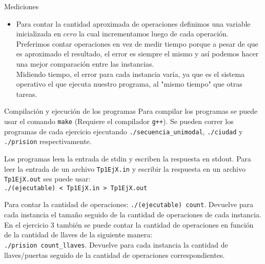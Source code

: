 \documentclass[12pt,titlepage]{article}
\begin{document}
	\begin{section}{Mediciones}
		\begin{itemize}
			\item Para contar la cantidad aproximada de operaciones definimos una variable inicializada en $cero$ la cual incrementamos luego de cada operación. Preferimos contar operaciones en vez de medir tiempo porque a pesar de que es aproximado el resultado, el error es siempre el mismo y así podemos hacer una mejor comparación entre las instancias.\\
			Midiendo tiempo, el error para cada instancia varía, ya que es el sistema operativo el que ejecuta nuestro programa, al "mismo tiempo" que otras tareas.
		\end{itemize}
	\end{section}
	\begin{section}{Compilación y ejecución de los programas}
	Para compilar los programas se puede usar el comando \texttt{make} (Requiere el compilador \texttt{g++}).
	Se pueden correr los programas de cada ejercicio ejecutando \texttt{./secuencia\_unimodal}, \texttt{./ciudad} y \texttt{./prision} respectivamente.
		
	Los programas leen la entrada de stdin y escriben la respuesta en stdout. Para leer la entrada de un archivo \texttt{Tp1EjX.in} y escribir la respuesta en un archivo \texttt{Tp1EjX.out} ses puede usar:\\ \texttt{./(ejecutable) < Tp1EjX.in > Tp1EjX.out}

	Para contar la cantidad de operaciones: \texttt{./(ejecutable) count}. Devuelve para cada instancia el tamaño seguido de la cantidad de operaciones de cada instancia.
	En el ejercicio 3 también se puede contar la cantidad de operaciones en función de la cantidad de llaves de la siguiente manera:\\ \texttt{./prision count\_llaves}. Devuelve para cada instancia la cantidad de llaves/puertas seguido de la cantidad de operaciones correspondientes. 
	\end{section}
\end{document}
